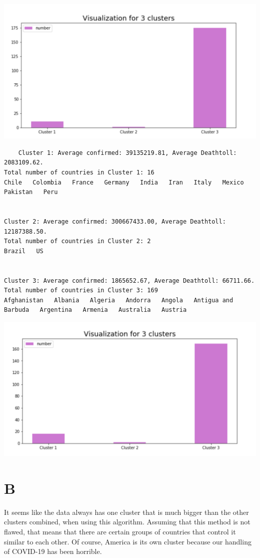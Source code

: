 \documentclass{article}
\begin{document}
\includegraphics[scale=0.75]{cluster_graph5.png}
\begin{verbatim}
    Cluster 1: Average confirmed: 39135219.81, Average Deathtoll: 2083109.62.
Total number of countries in Cluster 1: 16
Chile   Colombia   France   Germany   India   Iran   Italy   Mexico   Pakistan   Peru   


Cluster 2: Average confirmed: 300667433.00, Average Deathtoll: 12187388.50.
Total number of countries in Cluster 2: 2
Brazil   US   


Cluster 3: Average confirmed: 1865652.67, Average Deathtoll: 66711.66.
Total number of countries in Cluster 3: 169
Afghanistan   Albania   Algeria   Andorra   Angola   Antigua and Barbuda   Argentina   Armenia   Australia   Austria   

\end{verbatim}
\includegraphics[scale=0.75]{cluster_graph6.png}

\section{B}
It seems like the data always has one cluster that is much bigger than the other
clusters combined, when using this algorithm. Assuming that this method is not flawed,
that means that there are certain groups of countries that control it similar to each other.
Of course, America is its own cluster because our handling of COVID-19 has been horrible.
\end{document}
